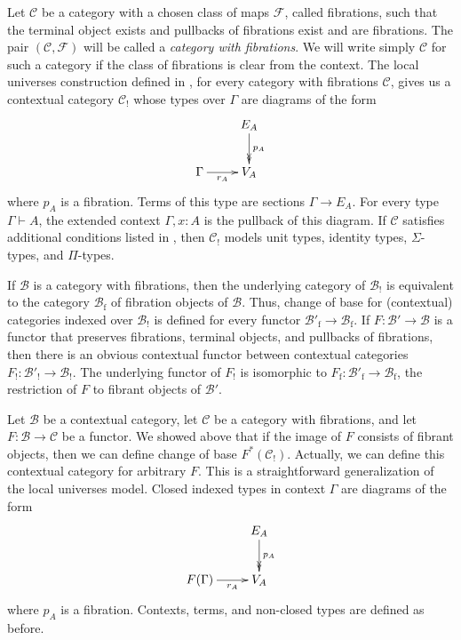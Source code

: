 \documentclass[reqno]{amsart}
\theoremstyle{definition}
\theoremstyle{remark}
\newcommand{\fs}[1]{\mathrm{#1}}
\newcommand{\scat}[1]{\mathcal{#1}}
\newcommand{\Fib}{\mathcal{F}}
\numberwithin{figure}{section}
\begin{document}
Let $\scat{C}$ be a category with a chosen class of maps $\Fib$, called fibrations, such that the terminal object exists and pullbacks of fibrations exist and are fibrations.
The pair $(\scat{C},\Fib)$ will be called a \emph{category with fibrations}.
We will write simply $\scat{C}$ for such a category if the class of fibrations is clear from the context.
The local universes construction defined in \cite{local-universes}, for every category with fibrations $\scat{C}$,
gives us a contextual category $\scat{C}_!$ whose types over $\Gamma$ are diagrams of the form
\[ \xymatrix{                       & E_A \ar@{->>}[d]^{p_A} \\
              \Gamma \ar[r]_-{r_A}  & V_A
            } \]
where $p_A$ is a fibration.
Terms of this type are sections $\Gamma \to E_A$.
For every type $\Gamma \vdash A$, the extended context $\Gamma, x : A$ is the pullback of this diagram.
If $\scat{C}$ satisfies additional conditions listed in \cite[Definition~4.2.1]{local-universes}, then $\scat{C}_!$ models unit types, identity types, $\Sigma$-types, and $\Pi$-types.

If $\scat{B}$ is a category with fibrations, then the underlying category of $\scat{B}_!$ is equivalent to the category $\scat{B}_\fs{f}$ of fibration objects of $\scat{B}$.
Thus, change of base for (contextual) categories indexed over $\scat{B}_!$ is defined for every functor $\scat{B}'_\fs{f} \to \scat{B}_\fs{f}$.
If $F : \scat{B}' \to \scat{B}$ is a functor that preserves fibrations, terminal objects, and pullbacks of fibrations, then there is an obvious contextual functor between contextual categories $F_! : \scat{B}'_! \to \scat{B}_!$.
The underlying functor of $F_!$ is isomorphic to $F_\fs{f} : \scat{B}'_\fs{f} \to \scat{B}_\fs{f}$, the restriction of $F$ to fibrant objects of $\scat{B}'$.

Let $\scat{B}$ be a contextual category, let $\scat{C}$ be a category with fibrations, and let $F : \scat{B} \to \scat{C}$ be a functor.
We showed above that if the image of $F$ consists of fibrant objects, then we can define change of base $F^*(\scat{C}_!)$.
Actually, we can define this contextual category for arbitrary $F$.
This is a straightforward generalization of the local universes model.
Closed indexed types in context $\Gamma$ are diagrams of the form
\[ \xymatrix{                           & E_A \ar@{->>}[d]^{p_A} \\
              F(\Gamma) \ar[r]_-{r_A}   & V_A
            } \]
where $p_A$ is a fibration.
Contexts, terms, and non-closed types are defined as before.
\end{document}
